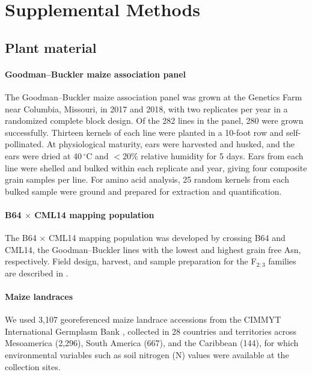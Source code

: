 \documentclass[11pt]{article}
\begin{document}
\section*{Supplemental Methods}

\subsection*{Plant material}

\paragraph*{Goodman--Buckler maize association panel}
The Goodman--Buckler maize association panel \citep{FlintGarcia2005Goodman} was grown at the Genetics Farm near Columbia, Missouri, in 2017 and 2018, with two replicates per year in a randomized complete block design. Of the 282 lines in the panel, 280 were grown successfully. Thirteen kernels of each line were planted in a 10-foot row and self-pollinated. At physiological maturity, ears were harvested and husked, and the ears were dried at 40\,$^{\circ}$C and $<$20\% relative humidity for 5 days. Ears from each line were shelled and bulked within each replicate and year, giving four composite grain samples per line. For amino acid analysis, 25 random kernels from each bulked sample were ground and prepared for extraction and quantification.

\paragraph*{B64 $\times$ CML14 mapping population}
The B64 $\times$ CML14 mapping population was developed by crossing B64 and CML14, the Goodman--Buckler lines with the lowest and highest grain free Asn, respectively. Field design, harvest, and sample preparation for the F$_{2:3}$ families are described in \citet{Fitzsimmons2026KernelKitchen}.

\paragraph*{Maize landraces}
We used 3,107 georeferenced maize landrace accessions from the CIMMYT International Germplasm Bank \citep{RomeroNavarro2017Landraces}, collected in 28 countries and territories across Mesoamerica (2,296), South America (667), and the Caribbean (144), for which environmental variables such as soil nitrogen (N) values were available at the collection sites.
\end{document}
